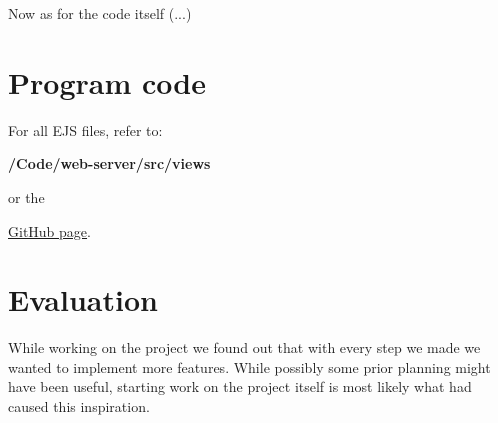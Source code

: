 \documentclass[a4paper,10pt]{article}
\begin{document}
Now as for the code itself (...)


\newpage
\section{Program code}
\lstset{style=code}









\par
For all EJS files, refer to: \par
{\centering \textbf{/Code/web-server/src/views} \par}
or the
{\centering \href{https://github.com/stl12033/Arduino-Programming/tree/main/Code/web-server/src/views}{GitHub page}.\par}

\section{Evaluation}
While working on the project we found out that with every step we made we wanted to implement more features. While possibly some prior planning might have been useful, starting work on the project itself is most likely what had caused this inspiration. 
\end{document}
